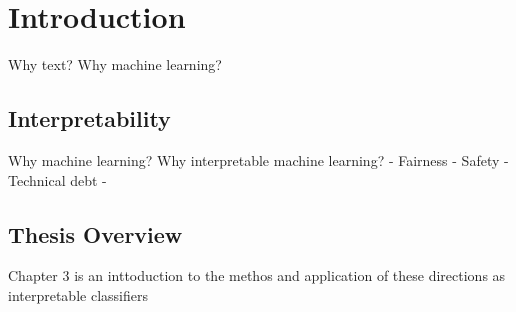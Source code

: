 \chapter{Introduction}
Why text?
Why machine learning?
\section{Interpretability}
Why machine learning?
Why interpretable machine learning?
	- Fairness
	- Safety
	- Technical debt
	- 

\section{Thesis Overview}
Chapter 3 is an inttoduction to the methos and application of these directions as interpretable classifiers
